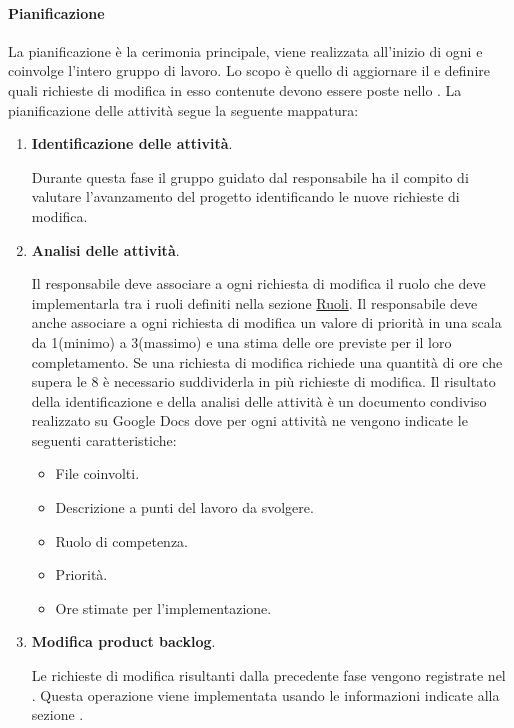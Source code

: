 \paragraph{Pianificazione}
La pianificazione è la cerimonia principale, viene realizzata all’inizio di ogni  e coinvolge l'intero gruppo di lavoro.
Lo scopo è quello di aggiornare il  e definire quali richieste di modifica in esso contenute devono essere poste nello .
La pianificazione delle attività segue la seguente mappatura:
\begin{enumerate}
    \item \textbf{Identificazione delle attività}.
    
    Durante questa fase il gruppo guidato dal responsabile ha il compito di valutare l’avanzamento del progetto identificando le nuove richieste di modifica.

    \item \textbf{Analisi delle attività}.
    
    Il responsabile deve associare a ogni richiesta di modifica il ruolo che deve implementarla tra i ruoli definiti nella sezione \hyperref[subsubsec:ruoli]{Ruoli}.
    Il responsabile deve anche associare a ogni richiesta di modifica un valore di priorità in una scala da 1(minimo) a 3(massimo) e una stima delle ore previste per il loro completamento.
    Se una richiesta di modifica richiede una quantità di ore che supera le 8 è necessario suddividerla in più richieste di modifica.
    Il risultato della identificazione e della analisi delle attività è un documento condiviso realizzato su Google Docs dove per ogni attività ne vengono indicate le seguenti caratteristiche:
    \begin{itemize}
        \item File coinvolti.
        \item Descrizione a punti del lavoro da svolgere.
        \item Ruolo di competenza.
        \item Priorità.
        \item Ore stimate per l'implementazione.
    \end{itemize}

    \item \textbf{Modifica product backlog}.
    
    Le richieste di modifica risultanti dalla precedente fase vengono registrate nel .
    Questa operazione viene implementata usando le informazioni indicate alla sezione \hyperref[subpar:ITS]{}.


\end{enumerate}
